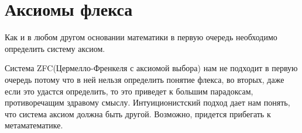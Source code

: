 \chapter{Аксиомы флекса}

Как и в любом другом основании математики в первую очередь необходимо определить систему аксиом.

Система ZFC(Цермелло-Френкеля с аксиомой выбора) нам не подходит в первую очередь потому что в ней нельзя определить понятие флекса, во вторых, даже если это удастся определить, то это приведет к большим парадоксам, противоречащим здравому смыслу. Интуиционистский подход дает нам понять, что система аксиом должна быть другой. Возможно, придется прибегать к метаматематике.

